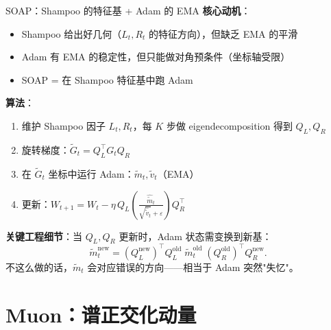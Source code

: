 \documentclass[aspectratio=169,10pt]{ctexbeamer}
\newcommand{\eps}{\varepsilon}
\begin{document}
\begin{frame}{SOAP：Shampoo 的特征基 + Adam 的 EMA}
\textbf{核心动机}：
\begin{itemize}
  \item Shampoo 给出好几何（$L_t,R_t$ 的特征方向），但缺乏 EMA 的平滑
  \item Adam 有 EMA 的稳定性，但只能做对角预条件（坐标轴受限）
  \item SOAP = 在 Shampoo 特征基中跑 Adam
\end{itemize}

\vspace{0.2cm}
\textbf{算法}：
\begin{enumerate}
  \item 维护 Shampoo 因子 $L_t,R_t$，每 $K$ 步做 eigendecomposition 得到 $Q_L,Q_R$
  \item 旋转梯度：$\tilde G_t = Q_L^\top G_t Q_R$
  \item 在 $\tilde G_t$ 坐标中运行 Adam：$\tilde m_t,\tilde v_t$（EMA）
  \item 更新：$W_{t+1}=W_t-\eta\,Q_L\!\left(\frac{\hat{\tilde m}_t}{\sqrt{\hat{\tilde v}_t}+\eps}\right)\!Q_R^\top$
\end{enumerate}

\vspace{0.2cm}
\textbf{关键工程细节}：当 $Q_L,Q_R$ 更新时，Adam 状态需变换到新基：
\[
  \tilde m_t^{\text{new}} = (Q_L^{\text{new}})^\top Q_L^{\text{old}}\;\tilde m_t^{\text{old}}\;(Q_R^{\text{old}})^\top Q_R^{\text{new}}.
\]
不这么做的话，$\tilde m_t$ 会对应错误的方向——相当于 Adam 突然"失忆"。
\end{frame}

\section{Muon：谱正交化动量}
\end{document}
